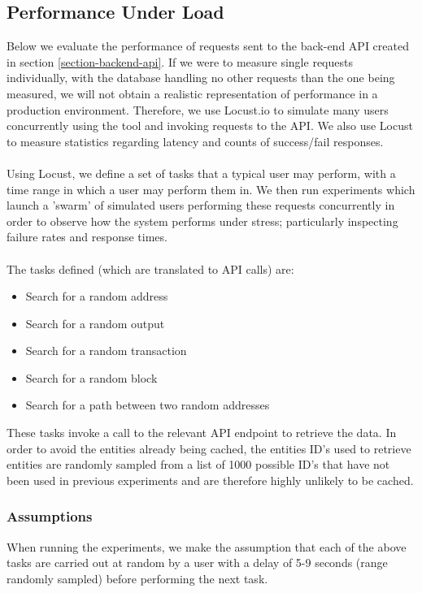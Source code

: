 \subsection{Performance Under Load}\label{evaluation:performance-under-load}
Below we evaluate the performance of requests sent to the back-end API created in section \ref{section-backend-api}. If we were to measure single requests individually, with the database handling no other requests than the one being measured, we will not obtain a realistic representation of performance in a production environment. Therefore, we use Locust.io to simulate many users concurrently using the tool and invoking requests to the API. We also use Locust to measure statistics regarding latency and counts of success/fail responses. 
\\\\
Using Locust, we define a set of tasks that a typical user may perform, with a time range in which a user may perform them in. We then run experiments which launch a 'swarm' of simulated users performing these requests concurrently in order to observe how the system performs under stress; particularly inspecting failure rates and response times.
\\\\
The tasks defined (which are translated to API calls) are:
\begin{itemize}
    \item Search for a random address
    \item Search for a random output
    \item Search for a random transaction 
    \item Search for a random block
    \item Search for a path between two random addresses
\end{itemize}
These tasks invoke a call to the relevant API endpoint to retrieve the data. In order to avoid the entities already being cached, the entities ID's used to retrieve entities are randomly sampled from a list of 1000 possible ID's that have not been used in previous experiments and are therefore highly unlikely to be cached. 

\subsubsection{Assumptions}
When running the experiments, we make the assumption that each of the above tasks are carried out at random by a user with a delay of 5-9 seconds (range randomly sampled) before performing the next task. 

